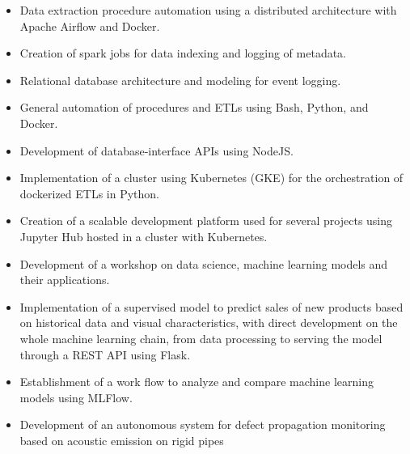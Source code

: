 \documentclass[10pt,a4paper,ragged2e,withhyper]{altacv}
\begin{document}
\begin{paracol}{2}
                \begin{itemize}
                    \item Data extraction procedure automation using a distributed architecture with Apache Airflow and Docker.
                    \item Creation of spark jobs for data indexing and logging of metadata.
                    \item Relational database architecture and modeling for event logging.
                    \item General automation of procedures and ETLs using Bash, Python, and Docker.
                    \item Development of database-interface APIs using NodeJS.
                \end{itemize}
            \divider
            
                \begin{itemize}
                    \item Implementation of a cluster using Kubernetes (GKE) for the orchestration of dockerized ETLs in Python.
                    \item Creation of a scalable development platform used for several projects using Jupyter Hub hosted in a cluster with Kubernetes.
                    \item Development of a workshop on data science, machine learning models and their applications.
                    \item Implementation of a supervised model to predict sales of new products based on historical data and visual
                    characteristics, with direct development on the whole machine learning chain, from data processing to serving
                    the model through a REST API using Flask.
                    \item Establishment of a work flow to analyze and compare machine learning models using MLFlow.
                \end{itemize}
            \divider
            \begin{itemize}
                \item Development of an autonomous system for defect propagation monitoring based on acoustic emission on rigid pipes
            \end{itemize}
            \divider
            

\end{paracol}
\end{document}
